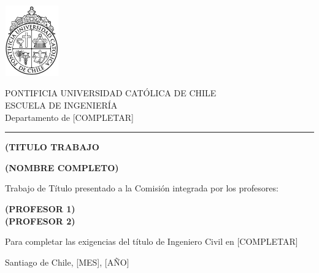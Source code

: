
\begin{minipage}{0.2\textwidth}
    \includegraphics[width=2.3cm]{content/logo.png}
\end{minipage}%
\hspace{0cm} %
\begin{minipage}{0.75\textwidth}
    \raggedright %
    PONTIFICIA UNIVERSIDAD CATÓLICA DE CHILE\\
    ESCUELA DE INGENIERÍA\\
    Departamento de [COMPLETAR]
\end{minipage}

\vspace{0.2cm}
\hrule
\vspace{4cm}

\hspace{3.8cm}
\begin{minipage}{\textwidth - 7.5cm}
\begin{center}
    {\LARGE\textbf{(TITULO TRABAJO}}

    \vspace{2cm}
    {\large\textbf{(NOMBRE COMPLETO)}}
\end{center}

\vspace{1cm}

Trabajo de Título presentado a la Comisión integrada por los profesores:

\textbf{(PROFESOR 1)}\\

\textbf{(PROFESOR 2)}\\

\vspace{1cm}

Para completar las exigencias del título de
Ingeniero Civil en [COMPLETAR]



\vspace{1.7cm}
Santiago de Chile, [MES], [AÑO]
\end{minipage}
\newpage
